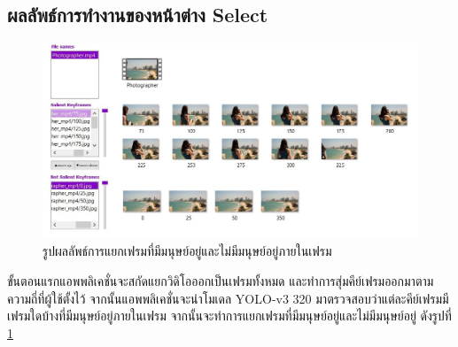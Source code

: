 \subsection*{ผลลัพธ์การทำงานของหน้าต่าง Select}
\begin{figure}[!ht]
  \centering
    \includegraphics[scale=0.6]{chapter4/images/Result/result_select3.jpg}
    \caption{รูปผลลัพธ์การแยกเฟรมที่มีมนุษย์อยู่และไม่มีมนุษย์อยู่ภายในเฟรม}
    \label{fig:result_select}
\end{figure}
ขั้นตอนแรกแอพพลิเคชั่นจะสกัดแยกวิดิโอออกเป็นเฟรมทั้งหมด และทำการสุ่มคีย์เฟรมออกมาตามความถี่ที่ผู้ใช้ตั้งไว้ จากนั้นแอพพลิเคชั่นจะนำโมเดล YOLO-v3 320 
มาตรวจสอบว่าแต่ละคีย์เฟรมมีเฟรมใดบ้างที่มีมนุษย์อยู่ภายในเฟรม จากนั้นจะทำการแยกเฟรมที่มีมนุษย์อยู่และไม่มีมนุษย์อยู่ ดังรูปที่ \ref{fig:result_select}


